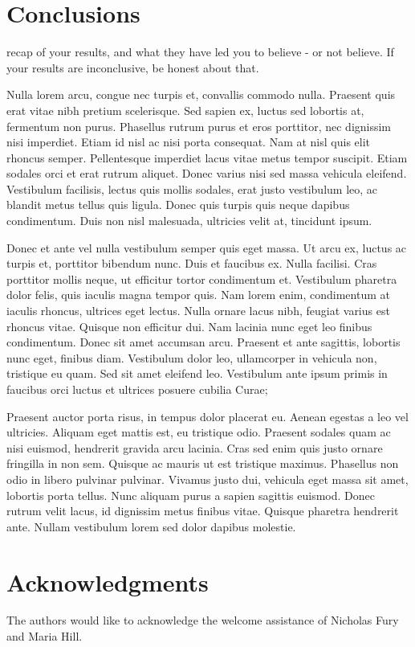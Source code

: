 \documentclass[twocolumn]{IEEEtran}
\begin{document}
\section{Conclusions}
 recap of your results, and what they have led you to believe - or not believe. If your results are inconclusive, be honest about that.

Nulla lorem arcu, congue nec turpis et, convallis commodo nulla. Praesent quis erat vitae nibh pretium scelerisque. Sed sapien ex, luctus sed lobortis at, fermentum non purus. Phasellus rutrum purus et eros porttitor, nec dignissim nisi imperdiet. Etiam id nisl ac nisi porta consequat. Nam at nisl quis elit rhoncus semper. Pellentesque imperdiet lacus vitae metus tempor suscipit. Etiam sodales orci et erat rutrum aliquet. Donec varius nisi sed massa vehicula eleifend. Vestibulum facilisis, lectus quis mollis sodales, erat justo vestibulum leo, ac blandit metus tellus quis ligula. Donec quis turpis quis neque dapibus condimentum. Duis non nisl malesuada, ultricies velit at, tincidunt ipsum.

Donec et ante vel nulla vestibulum semper quis eget massa. Ut arcu ex, luctus ac turpis et, porttitor bibendum nunc. Duis et faucibus ex. Nulla facilisi. Cras porttitor mollis neque, ut efficitur tortor condimentum et. Vestibulum pharetra dolor felis, quis iaculis magna tempor quis. Nam lorem enim, condimentum at iaculis rhoncus, ultrices eget lectus. Nulla ornare lacus nibh, feugiat varius est rhoncus vitae. Quisque non efficitur dui. Nam lacinia nunc eget leo finibus condimentum. Donec sit amet accumsan arcu. Praesent et ante sagittis, lobortis nunc eget, finibus diam. Vestibulum dolor leo, ullamcorper in vehicula non, tristique eu quam. Sed sit amet eleifend leo. Vestibulum ante ipsum primis in faucibus orci luctus et ultrices posuere cubilia Curae;

Praesent auctor porta risus, in tempus dolor placerat eu. Aenean egestas a leo vel ultricies. Aliquam eget mattis est, eu tristique odio. Praesent sodales quam ac nisi euismod, hendrerit gravida arcu lacinia. Cras sed enim quis justo ornare fringilla in non sem. Quisque ac mauris ut est tristique maximus. Phasellus non odio in libero pulvinar pulvinar. Vivamus justo dui, vehicula eget massa sit amet, lobortis porta tellus. Nunc aliquam purus a sapien sagittis euismod. Donec rutrum velit lacus, id dignissim metus finibus vitae. Quisque pharetra hendrerit ante. Nullam vestibulum lorem sed dolor dapibus molestie.

\section*{Acknowledgments}
The authors would like to acknowledge the welcome assistance of Nicholas Fury and Maria Hill.
\end{document}
